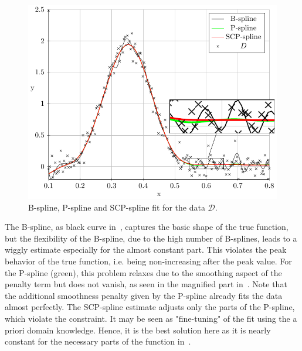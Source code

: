 \begin{figure}[H]
	\centering
	\includegraphics{graphics/pgfplots/cha4/exp-peak.pdf}
	\caption{B-spline, P-spline and SCP-spline fit for the data $\mathcal{D}$.}
	\label{fig:test-func-peak-fit}
\end{figure}
%
The B-spline, as black curve in~, captures the basic shape of the true function, but the flexibility of the B-spline, due to the high number of B-splines, leads to a wiggly estimate especially for the almost constant part. This violates the peak behavior of the true function, i.e. being non-increasing after the peak value. For the P-spline (green), this problem relaxes due to the smoothing aspect of the penalty term but does not vanish, as seen in the magnified part in~. Note that the additional smoothness penalty given by the P-spline already fits the data almost perfectly. The SCP-spline estimate adjusts only the parts of the P-spline, which violate the constraint. It may be seen as "fine-tuning" of the fit using the a priori domain knowledge. Hence, it is the best solution here as it is nearly constant for the necessary parts of the function in~.  

